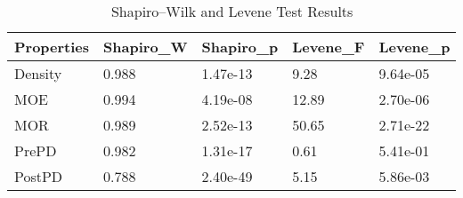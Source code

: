 \begin{table}[ht]
\centering
\begin{tabular}{lllll}
  \hline
Properties & Shapiro\_W & Shapiro\_p & Levene\_F & Levene\_p \\ 
  \hline
Density & 0.988 & 1.47e-13 & 9.28 & 9.64e-05 \\ 
  MOE & 0.994 & 4.19e-08 & 12.89 & 2.70e-06 \\ 
  MOR & 0.989 & 2.52e-13 & 50.65 & 2.71e-22 \\ 
  PrePD & 0.982 & 1.31e-17 & 0.61 & 5.41e-01 \\ 
  PostPD & 0.788 & 2.40e-49 & 5.15 & 5.86e-03 \\ 
   \hline
\end{tabular}
\caption{Shapiro–Wilk and Levene Test Results} 
\end{table}
